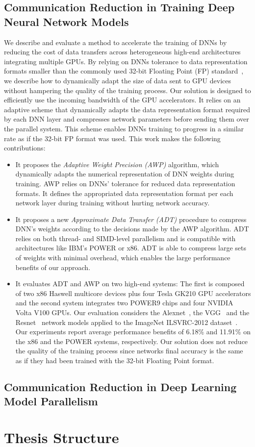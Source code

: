 \subsection{Communication Reduction in Training Deep Neural Network Models}
We describe and evaluate a method to accelerate the training of DNNs by reducing 
the cost of data transfers across heterogeneous high-end architectures 
integrating multiple GPUs. By relying on DNNs tolerance to data representation 
formats smaller than the commonly used 32-bit Floating Point (FP) 
standard~\cite{gupta15, flexpoint17}, we describe how to dynamically adapt the 
size of data sent to GPU devices without hampering the quality of the training 
process.  Our solution is designed to efficiently use the incoming bandwidth of 
the GPU accelerators.
It relies on an adaptive scheme that dynamically adapts the data representation 
format required by each DNN layer and compresses network parameters before 
sending them over the parallel system.
This scheme enables DNNs training to progress in a similar rate as if the 32-bit 
FP format was used.
This work makes the following contributions:
\begin{itemize}
    \item It proposes the {\it Adaptive Weight Precision (AWP)} algorithm, which 
        dynamically adapts the numerical representation of DNN weights during 
        training.  AWP relies on DNNs' tolerance for reduced data representation 
        formats.  It defines the appropriated data representation format per 
        each network layer during  training without hurting network accuracy.

    \item It proposes a new {\it Approximate Data Transfer (ADT)} procedure to 
        compress DNN's weights according to the decisions made by the AWP 
        algorithm.  ADT relies on both thread- and SIMD-level parallelism  and 
        is compatible with architectures like IBM's POWER or x86. ADT is able to 
        compress large sets of weights with minimal overhead, which enables the 
        large performance benefits of our approach.

    \item It evaluates ADT and AWP on two high-end systems: The first is 
        composed of two x86 Haswell multicore devices plus four Tesla GK210 GPU 
        accelerators and the second system integrates two POWER9 chips and four 
        NVIDIA Volta V100 GPUs.  Our evaluation considers the 
        Alexnet~\cite{alexnet}, the VGG~\cite{vgg} and the Resnet~\cite{resnet} 
        network models applied to the ImageNet ILSVRC-2012 
        dataset~\cite{imagenet}.
        Our experiments report average performance benefits of 6.18\% and 
        11.91\% on the x86 and the POWER systems, respectively.
        Our solution does not reduce the quality of the training process since 
        networks final accuracy is the same as if they had been trained with the 
        32-bit Floating Point format.
\end{itemize}

\subsection{Communication Reduction in Deep Learning Model Parallelism}


\section{Thesis Structure}
